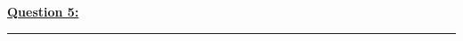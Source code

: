 \documentclass[12pt]{article}
\newcommand{\code}[1]{{\ttfamily \fontseries{b}\selectfont #1}}
\begin{document}
\noindent \hyperlink{5}{\textbf{Question 5:}}
\vspace{1mm}
\hrule
\vspace{1mm} \leavevmode \\
\newpage
\end{document}
